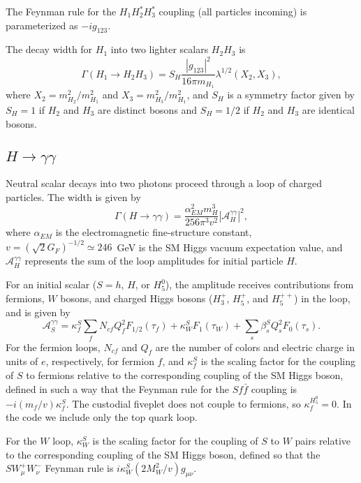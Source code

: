 \documentclass[11pt]{article}
\begin{document}
The Feynman rule for the $H_1 H_2^* H_3^*$ coupling (all particles incoming) is parameterized as $-i g_{123}$.

The decay width for $H_1$ into two lighter scalars $H_2 H_3$ is
\begin{equation}
	\Gamma(H_1 \to H_2 H_3) = S_H \frac{|g_{123}|^2}{16 \pi m_{H_1}}
	\lambda^{1/2}(X_2, X_3),
\end{equation}
where $X_2 = m_{H_2}^2/m_{H_1}^2$ and $X_3 = m_{H_3}^2/m_{H_1}^2$, and $S_H$ is a symmetry factor given by $S_H = 1$ if $H_2$ and $H_3$ are distinct bosons and $S_H = 1/2$ if $H_2$ and $H_3$ are identical bosons.

\subsection{$H \to \gamma\gamma$}

Neutral scalar decays into two photons proceed through a loop of charged particles.  The width is given by~\cite{HHG}
\begin{equation}
	\Gamma(H \to \gamma\gamma) = \frac{\alpha_{EM}^2 m_H^3}{256 \pi^3 v^2}
	| \mathcal{A}_H^{\gamma\gamma} |^2,
\end{equation}
where $\alpha_{EM}$ is the electromagnetic fine-structure constant, $v = (\sqrt{2} G_F)^{-1/2} \simeq 246$~GeV is the SM Higgs vacuum expectation value, and $\mathcal{A}_H^{\gamma\gamma}$ represents the sum of the loop amplitudes for initial particle $H$.

For an initial scalar ($S = h$, $H$, or $H_5^0$), the amplitude receives contributions from fermions, $W$ bosons, and charged Higgs bosons ($H_3^+$, $H_5^+$, and $H_5^{++}$) in the loop, and is given by
\begin{equation}
	\mathcal{A}_S^{\gamma\gamma} 
	= \kappa_f^S \sum_f N_{cf} Q_f^2 F_{1/2}(\tau_f)
	+ \kappa_W^S F_1(\tau_W)
	+ \sum_s \beta_s^S Q_s^2 F_0(\tau_s).
\end{equation}
For the fermion loops, $N_{cf}$ and $Q_f$ are the number of colors and electric charge in units of $e$, respectively, for fermion $f$, and $\kappa_f^S$ is the scaling factor for the coupling of $S$ to fermions relative to the corresponding coupling of the SM Higgs boson, defined in such a way that the Feynman rule for the $S f \bar f$ coupling is $-i (m_f/v) \kappa^S_f$.  The custodial fiveplet does not couple to fermions, so $\kappa_f^{H_5^0} = 0$.  In the code we include only the top quark loop.

For the $W$ loop, $\kappa_W^S$ is the scaling factor for the coupling of $S$ to $W$ pairs relative to the corresponding coupling of the SM Higgs boson, defined so that the $S W^+_{\mu} W^-_{\nu}$ Feynman rule is $i \kappa_W^S (2 M_W^2/v) g_{\mu\nu}$.
\end{document}
